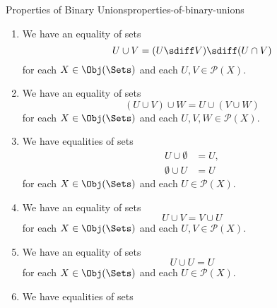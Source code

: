\begin{proposition}{Properties of Binary Unions}{properties-of-binary-unions}
\begin{enumerate}
\begin{itemize}
                    \begin{itemize}
                        \item[$(\star)$]If $U\subset U'$ and $V\subset V'$, then $U\cup V\subset U'\cup V'$.
                    \end{itemize}
            \end{itemize}
            and where $U\cup-$ and $-\cup V$ are the partial functors of $-_{1}\cup-_{2}$ at $U,V\in\mathcal{P}(X)$.
        \item\label{properties-of-binary-unions-via-intersections-and-symmetric-differences}We have an equality of sets
            \[%
                U\cup V%
                =%
                (U\sdiff V)%
                \sdiff%
                (U\cap V)%
            \]%
            for each $X\in\Obj(\Sets)$ and each $U,V\in\mathcal{P}(X)$.
        \item\label{properties-of-binary-unions-associativity}We have an equality of sets%
            \[
                (U\cup V)\cup W
                =
                U\cup(V\cup W)
            \]%
            for each $X\in\Obj(\Sets)$ and each $U,V,W\in\mathcal{P}(X)$.
        \item\label{properties-of-binary-unions-unitality}We have equalities of sets
            \begin{align*}
                U\cup\emptyset  &= U,\\
                \emptyset\cup U &= U
            \end{align*}
            for each $X\in\Obj(\Sets)$ and each $U\in\mathcal{P}(X)$.
        \item\label{properties-of-binary-unions-commutativity}We have an equality of sets
            \[
                U\cup V
                =
                V\cup U
            \]%
            for each $X\in\Obj(\Sets)$ and each $U,V\in\mathcal{P}(X)$.
        \item\label{properties-of-binary-unions-idempotency}We have an equality of sets
            \[
                U\cup U%
                =%
                U%
            \]%
            for each $X\in\Obj(\Sets)$ and each $U\in\mathcal{P}(X)$.
        \item\label{properties-of-binary-unions-distributivity-over-intersections}We have equalities of sets
            \begin{align*}

\end{align*}
\end{enumerate}
\end{proposition}
